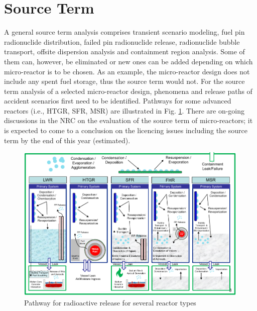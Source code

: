 \documentclass[10pt,a4paper]{article}
\begin{document}
\section{Source Term}
A general source term analysis comprises transient scenario modeling, fuel pin radionuclide distribution, failed pin radionuclide release, radionuclide bubble transport, offsite dispersion analysis and containment region analysis. Some of them can, however, be eliminated or new ones can be added depending on which micro-reactor is to be chosen. As an example, the micro-reactor design does not include any spent fuel storage, thus the source term would not.
For the source term analysis of a selected micro-reactor design, phenomena and release paths of accident scenarios first need to be identified. Pathways for some advanced reactors (i.e., HTGR, SFR, MSR) are illustrated in Fig. \ref{pathway}. There are on-going discussions in the NRC on the evaluation of the source term of micro-reactors; it is expected to come to a conclusion on the licencing issues including the source term by the end of this year (estimated). 

\begin{figure}[hbtp]
\centering
\includegraphics[scale=0.6]{Figs/pathway.jpeg}
\caption{Pathway for radioactive release for several reactor types}
\label{pathway}
\end{figure}
\end{document}
